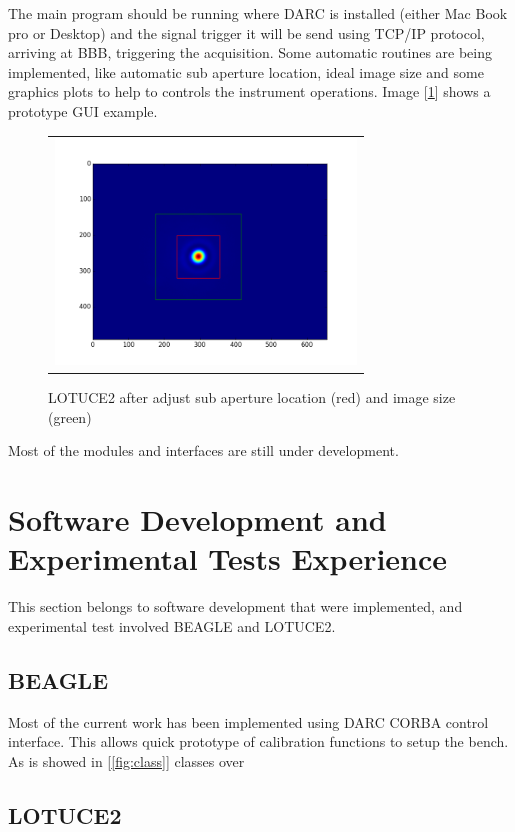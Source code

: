 \documentclass[]{spie}  %
\begin{document}
The main program should be running where DARC is installed (either Mac Book pro
        or Desktop) and the signal trigger it will be send using TCP/IP
protocol, arriving at BBB, triggering the acquisition. Some automatic routines
are being implemented, like automatic sub aperture location, ideal image size
and some graphics plots to help to controls the instrument operations. Image
[\ref{fig:step2}] shows a prototype GUI example.

   \begin{figure}[!ht]
   \begin{center}
   \begin{tabular}{c}
   \includegraphics[height=6.0cm]{../img/step2b.png}
   \end{tabular}
   \end{center}
   \caption[step2] 
   { \label{fig:step2} LOTUCE2 after adjust sub aperture location (red) and image size (green)}
   \end{figure} 

Most of the modules and interfaces are still under development.
\section{Software Development and Experimental Tests Experience} \label{sec:LL}
This section belongs to software development that were implemented, and
experimental test involved BEAGLE and LOTUCE2. 
\subsection{BEAGLE}
Most of the current work has been implemented using DARC CORBA control
interface. This allows quick prototype of calibration functions to setup the
bench. As is showed in [\ref{fig:class}] classes over 
\subsection{LOTUCE2}
\end{document}
